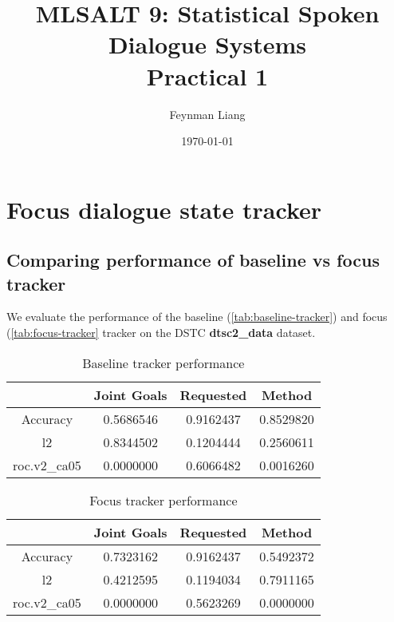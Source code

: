 \documentclass[a4paper,oneside,reqno]{amsart}
\newcommand{\authorname}{Feynman Liang}
\newcommand{\coursename}{MLSALT 9: Statistical Spoken Dialogue Systems}
\newcommand{\assignmentname}{Practical 1}
\begin{document}
%

\title{\coursename\\\assignmentname}

\author{\authorname}
\date{\today}

\maketitle

\section{Focus dialogue state tracker}

\subsection{Comparing performance of baseline vs focus tracker}

We evaluate the performance of the baseline (\autoref{tab:baseline-tracker})
and focus (\autoref{tab:focus-tracker} tracker on the DSTC \textbf{dtsc2\_data}
dataset.

\begin{table}[ht!]
  \begin{tabular}{cccc}
    \toprule
                  &   Joint Goals   &    Requested    &      Method    \\
    \midrule
    Accuracy      &    0.5686546    &    0.9162437    &    0.8529820   \\
    l2            &    0.8344502    &    0.1204444    &    0.2560611   \\
    roc.v2\_ca05  &    0.0000000    &    0.6066482    &    0.0016260   \\
    \bottomrule
  \end{tabular}
  \caption{Baseline tracker performance}
  \label{tab:baseline-tracker}
\end{table}

\begin{table}[ht!]
  \begin{tabular}{cccc}
    \toprule
                  &   Joint Goals   &    Requested    &      Method    \\
    \midrule
    Accuracy      &    0.7323162    &    0.9162437    &    0.5492372   \\
    l2            &    0.4212595    &    0.1194034    &    0.7911165   \\
    roc.v2\_ca05  &    0.0000000    &    0.5623269    &    0.0000000   \\
    \bottomrule
  \end{tabular}
  \caption{Focus tracker performance}
  \label{tab:focus-tracker}
\end{table}
\end{document}
